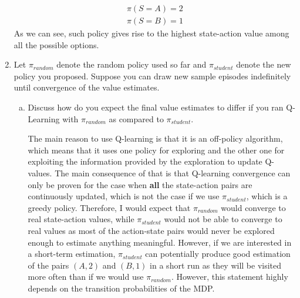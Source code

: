 \documentclass{exam}
\begin{document}
\begin{problem}
\begin{enumerate}
\begin{solutionorlines}[2in]
    \begin{align*}
        \pi(S=A) = 2\\
        \pi(S=B) = 1
    \end{align*}
    As we can see, such policy gives rise to the highest state-action value among all the possible options. 
    \end{solutionorlines}
    \item Let $\pi_{random}$ denote the random policy used so far and $\pi_{student}$ denote the new policy you proposed. Suppose you can draw new sample episodes indefinitely until convergence of the value estimates.
    \begin{enumerate}[(a)]
        \item Discuss how do you expect the final value estimates to differ if you ran Q-Learning with  $\pi_{random}$ as compared to $\pi_{student}$.
        \begin{solutionorlines}[2in]
        The main reason to use Q-learning is that it is an off-policy algorithm, which means that it uses one policy for exploring and the other one for exploiting the information provided by the exploration to update Q-values. The main consequence of that is that Q-learning convergence can only be proven for the case when \textbf{all} the state-action pairs are continuously updated, which is not the case if we use $\pi_{student}$, which is a greedy policy. Therefore, I would expect that $\pi_{random}$ would converge to real state-action values, while $\pi_{student}$ would not be able to converge to real values as most of the action-state pairs would never be explored enough to estimate anything meaningful. However, if we are interested in a short-term estimation, $\pi_{student}$ can potentially produce good estimation of the pairs $(A, 2)$ and $(B, 1)$ in a short run as they will be visited more often than if we would use $\pi_{random}$. However, this statement highly depends on the transition probabilities of the MDP.

\end{solutionorlines}
\end{enumerate}
\end{enumerate}
\end{problem}
\end{document}
